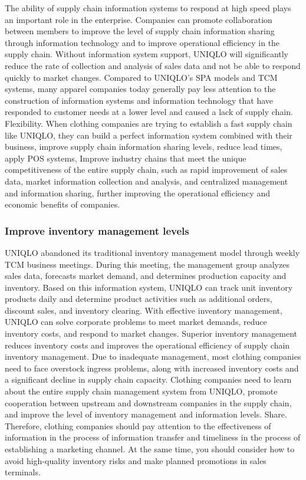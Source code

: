 \documentclass[12pt,a4paper]{article}
\begin{document}
The ability of supply chain information systems to respond at high speed
plays an important role in the enterprise. Companies can promote
collaboration between members to improve the level of supply chain
information sharing through information technology and to improve
operational efficiency in the supply chain. Without information system
support, UNIQLO will significantly reduce the rate of collection and
analysis of sales data and not be able to respond quickly to market
changes. Compared to UNIQLO's SPA models and TCM systems, many apparel
companies today generally pay less attention to the construction of
information systems and information technology that have responded to
customer needs at a lower level and caused a lack of supply chain.
Flexibility. When clothing companies are trying to establish a fast
supply chain like UNIQLO, they can build a perfect information system
combined with their business, improve supply chain information sharing
levels, reduce lead times, apply POS systems, Improve industry chains
that meet the unique competitiveness of the entire supply chain, such as
rapid improvement of sales data, market information collection and
analysis, and centralized management and information sharing, further
improving the operational efficiency and economic benefits of companies.

\hypertarget{improve-inventory-management-levels}{%
\subsubsection{Improve inventory management
levels}\label{improve-inventory-management-levels}}

UNIQLO abandoned its traditional inventory management model through
weekly TCM business meetings. During this meeting, the management group
analyzes sales data, forecasts market demand, and determines production
capacity and inventory. Based on this information system, UNIQLO can
track unit inventory products daily and determine product activities
such as additional orders, discount sales, and inventory clearing. With
effective inventory management, UNIQLO can solve corporate problems to
meet market demands, reduce inventory costs, and respond to market
changes. Superior inventory management reduces inventory costs and
improves the operational efficiency of supply chain inventory
management. Due to inadequate management, most clothing companies need
to face overstock ingress problems, along with increased inventory costs
and a significant decline in supply chain capacity. Clothing companies
need to learn about the entire supply chain management system from
UNIQLO, promote cooperation between upstream and downstream companies in
the supply chain, and improve the level of inventory management and
information levels. Share. Therefore, clothing companies should pay
attention to the effectiveness of information in the process of
information transfer and timeliness in the process of establishing a
marketing channel. At the same time, you should consider how to avoid
high-quality inventory risks and make planned promotions in sales
terminals.
\end{document}
